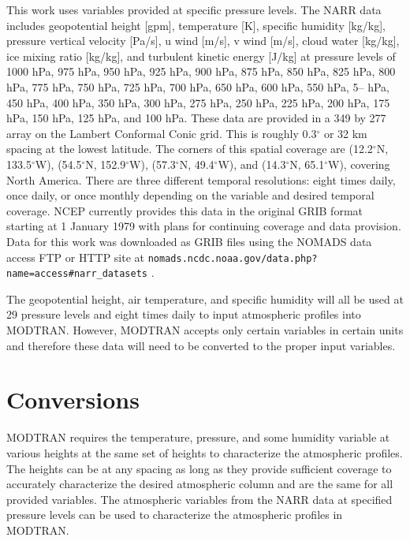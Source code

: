 \documentclass{book}
\begin{document}
This work uses variables provided at specific pressure levels.  The NARR data includes geopotential height [gpm], temperature [K], specific humidity [kg/kg], pressure vertical velocity [Pa/s], u wind [m/s], v wind [m/s], cloud water [kg/kg], ice mixing ratio [kg/kg], and turbulent kinetic energy [J/kg] at pressure levels of 1000 hPa, 975 hPa, 950 hPa, 925 hPa, 900 hPa, 875 hPa, 850 hPa, 825 hPa, 800 hPa, 775 hPa, 750 hPa, 725 hPa, 700 hPa, 650 hPa, 600 hPa, 550 hPa, 5-- hPa, 450 hPa, 400 hPa, 350 hPa, 300 hPa, 275 hPa, 250 hPa, 225 hPa, 200 hPa, 175 hPa, 150 hPa, 125 hPa, and 100 hPa.  These data are provided in a 349 by 277 array on the Lambert Conformal Conic grid.  This is roughly 0.3$^\circ$ or 32 km spacing at the lowest latitude.  The corners of this spatial coverage are (12.2$^\circ$N, 133.5$^\circ$W), (54.5$^\circ$N, 152.9$^\circ$W), (57.3$^\circ$N, 49.4$^\circ$W), and (14.3$^\circ$N, 65.1$^\circ$W), covering North America.  There are three different temporal resolutions: eight times daily, once daily, or once monthly depending on the variable and desired temporal coverage. NCEP currently provides this data in the original GRIB format starting at 1 January 1979 with plans for continuing coverage and data provision.  Data for this work was downloaded as GRIB files using the NOMADS data access FTP or HTTP site at {\tt nomads.ncdc.noaa.gov/data.php?name=access\#narr\_datasets} \cite{narr_data}.

The geopotential height, air temperature, and specific humidity will all be used at 29 pressure levels and eight times daily to input atmospheric profiles into MODTRAN.  However, MODTRAN accepts only certain variables in certain units and therefore these data will need to be converted to the proper input variables. \\

\section{Conversions}
\label{sec:conversions}

MODTRAN requires the temperature, pressure, and some humidity variable at various heights at the same set of heights to characterize the atmospheric profiles.  The heights can be at any spacing as long as they provide sufficient coverage to accurately characterize the desired atmospheric column and are the same for all provided variables.  The atmospheric variables from the NARR data at specified pressure levels can be used to characterize the atmospheric profiles in MODTRAN.
\end{document}
